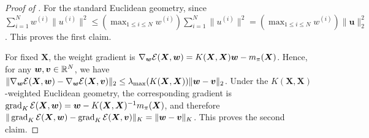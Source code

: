 \begin{proof}[Proof of ]
For the standard Euclidean geometry, since $\sum_{i=1}^Nw^{(i)}\|u^{(i)}\|^2
\leq
\left(\max_{1\leq i\leq N}w^{(i)}\right)
\sum_{i=1}^N\|u^{(i)}\|^2
=
\left(\max_{1\leq i\leq N}w^{(i)}\right)
\|\bm{u}\|_2^2$. 
This proves the first claim.

For fixed $\bm{X}$, the weight gradient is $\nabla_{\bm{w}}\mathcal{E}(\bm{X},\bm{w})=K(\bm{X},\bm{X})\bm{w}-m_\pi(\bm{X})$. Hence, for any $\bm{w},\bm{v}\in\mathbb{R}^N$, we have $\|\nabla_{\bm{w}}\mathcal{E}(\bm{X},\bm{w})-\nabla_{\bm{w}}\mathcal{E}(\bm{X},\bm{v})\|_2\leq\lambda_{\max}(K(\bm{X},\bm{X}))\|\bm{w}-\bm{v}\|_2$. Under the $K(\bm{X},\bm{X})$-weighted Euclidean geometry, the corresponding gradient is $\operatorname{grad}_K\mathcal{E}(\bm{X},\bm{w})=\bm{w}-K(\bm{X},\bm{X})^{-1}m_\pi(\bm{X})$, and therefore $\|\operatorname{grad}_K\mathcal{E}(\bm{X},\bm{w})-\operatorname{grad}_K\mathcal{E}(\bm{X},\bm{v})\|_K=\|\bm{w}-\bm{v}\|_K$. This proves the second claim.
\end{proof}

